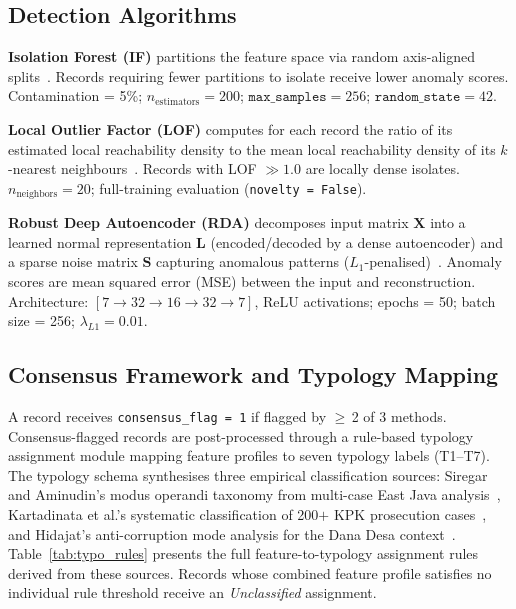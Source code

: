 \documentclass[3p,times,procedia]{elsarticle}
\begin{document}
\subsection{Detection Algorithms}

\textbf{Isolation Forest (IF)} partitions the feature space via random axis-aligned splits~\cite{ref24,ref25}. Records requiring fewer partitions to isolate receive lower anomaly scores. Contamination = 5\%; $n_{\text{estimators}} = 200$; $\texttt{max\_samples} = 256$; $\texttt{random\_state} = 42$.

\textbf{Local Outlier Factor (LOF)} computes for each record the ratio of its estimated local reachability density to the mean local reachability density of its $k$-nearest neighbours~\cite{ref26}. Records with LOF $\gg 1.0$ are locally dense isolates. $n_{\text{neighbors}} = 20$; full-training evaluation (\texttt{novelty = False}).

\textbf{Robust Deep Autoencoder (RDA)} decomposes input matrix $\mathbf{X}$ into a learned normal representation $\mathbf{L}$ (encoded/decoded by a dense autoencoder) and a sparse noise matrix $\mathbf{S}$ capturing anomalous patterns ($L_1$-penalised)~\cite{ref27}. Anomaly scores are mean squared error (MSE) between the input and reconstruction. Architecture: $[7 \to 32 \to 16 \to 32 \to 7]$, ReLU activations; epochs = 50; batch size = 256; $\lambda_{L1} = 0.01$.

\subsection{Consensus Framework and Typology Mapping}

A record receives \texttt{consensus\_flag = 1} if flagged by $\geq$\,2 of 3 methods. Consensus-flagged records are post-processed through a rule-based typology assignment module mapping feature profiles to seven typology labels (T1--T7). The typology schema synthesises three empirical classification sources: Siregar and Aminudin's modus operandi taxonomy from multi-case East Java analysis~\cite{ref13}, Kartadinata et al.'s systematic classification of 200$+$ KPK prosecution cases~\cite{ref14}, and Hidajat's anti-corruption mode analysis for the Dana Desa context~\cite{ref12}. Table~\ref{tab:typo_rules} presents the full feature-to-typology assignment rules derived from these sources. Records whose combined feature profile satisfies no individual rule threshold receive an \textit{Unclassified} assignment.
\end{document}
